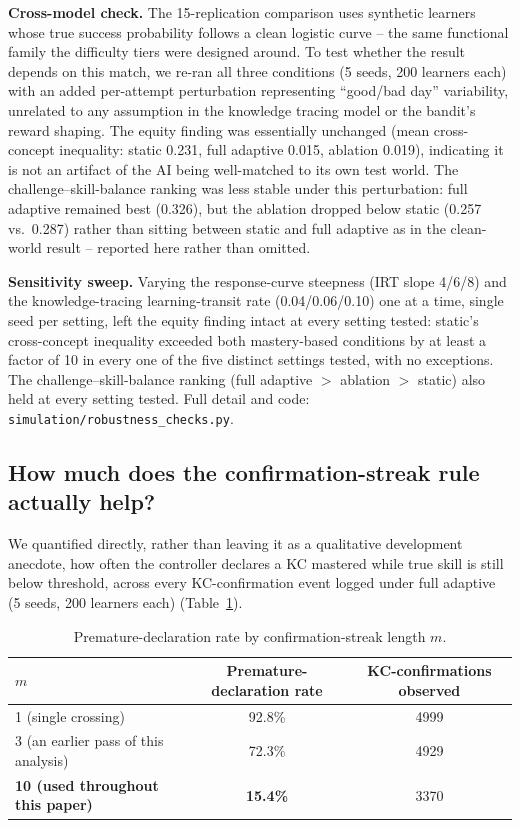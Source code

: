 \documentclass[11pt]{article}
\begin{document}
\textbf{Cross-model check.} The 15-replication comparison uses synthetic learners whose true success probability follows a clean logistic curve -- the same functional family the difficulty tiers were designed around. To test whether the result depends on this match, we re-ran all three conditions (5 seeds, 200 learners each) with an added per-attempt perturbation representing ``good/bad day'' variability, unrelated to any assumption in the knowledge tracing model or the bandit's reward shaping. The equity finding was essentially unchanged (mean cross-concept inequality: static 0.231, full adaptive 0.015, ablation 0.019), indicating it is not an artifact of the AI being well-matched to its own test world. The challenge--skill-balance ranking was less stable under this perturbation: full adaptive remained best (0.326), but the ablation dropped below static (0.257 vs.\ 0.287) rather than sitting between static and full adaptive as in the clean-world result -- reported here rather than omitted.

\textbf{Sensitivity sweep.} Varying the response-curve steepness (IRT slope 4/6/8) and the knowledge-tracing learning-transit rate (0.04/0.06/0.10) one at a time, single seed per setting, left the equity finding intact at every setting tested: static's cross-concept inequality exceeded both mastery-based conditions by at least a factor of 10 in every one of the five distinct settings tested, with no exceptions. The challenge--skill-balance ranking (full adaptive $>$ ablation $>$ static) also held at every setting tested. Full detail and code: \texttt{simulation/robustness\_checks.py}.

\subsection{How much does the confirmation-streak rule actually help?}

We quantified directly, rather than leaving it as a qualitative development anecdote, how often the controller declares a KC mastered while true skill is still below threshold, across every KC-confirmation event logged under full adaptive (5 seeds, 200 learners each) (Table~\ref{tab:table3}).

\begin{table}[h]
\centering
\caption{Premature-declaration rate by confirmation-streak length $m$.}
\label{tab:table3}
\begin{tabular}{@{}lcc@{}}
\toprule
$m$ & Premature-declaration rate & KC-confirmations observed \\
\midrule
1 (single crossing) & 92.8\% & 4999 \\
3 (an earlier pass of this analysis) & 72.3\% & 4929 \\
\textbf{10 (used throughout this paper)} & \textbf{15.4\%} & 3370 \\
\bottomrule
\end{tabular}
\end{table}
\end{document}
